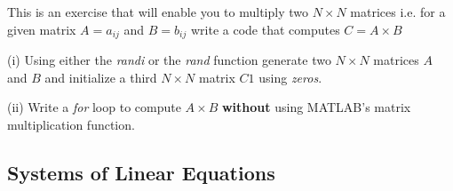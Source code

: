 \documentclass[12pt]{report}
\begin{document}
\begin{tcolorbox}[title=Task (Matrix Multiplication Algorithm)]
This is an exercise that will enable you to multiply two $N\times{N}$ matrices i.e. for a given matrix $A=a_{ij}$ and $B=b_{ij}$ write a code that computes $C=A\times{B}$
\vspace{5mm}

(i) Using either the \textit{randi} or the \textit{rand} function generate two $N\times{N}$ matrices $A$ and $B$  and initialize a third $N\times{N}$ matrix $C1$ using \textit{zeros}.
\vspace{2mm}

(ii) Write a \textit{for} loop to compute $A\times{B}$ \textbf{without} using MATLAB's matrix multiplication function.
 
\end{tcolorbox}

\subsection*{Systems of Linear Equations}
\end{document}
